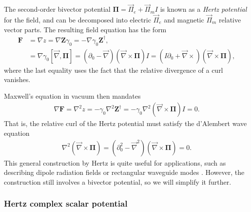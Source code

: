\documentclass[1p,sort&compress]{elsarticle}
\numberwithin{equation}{section}
\newcommand{\rv}[1]{\vec{#1}}
\newcommand{\bv}[1]{\mathbf{#1}}
\begin{document}
The second-order bivector potential $\bv{\Pi} = \rv{\Pi}_e + \rv{\Pi}_m I$ is known as a \emph{Hertz potential} for the field, and can be decomposed into electric $\rv{\Pi}_e$ and magnetic $\rv{\Pi}_m$ relative vector parts.  The resulting field equation has the form \cite{Bialynicki-Birula2013}
\begin{align}
  \bv{F} &= \nabla z = \nabla \bv{Z}\gamma_0 = - \nabla \gamma_0 \bv{Z}^\dagger, \\
  &= \nabla \gamma_0 [\rv{\nabla},\bv{\Pi}] = (\partial_0 - \rv{\nabla})(\rv{\nabla}\times\bv{\Pi}) I = (I\partial_0 + \rv{\nabla}\times)(\rv{\nabla}\times\bv{\Pi}), \nonumber
\end{align}
where the last equality uses the fact that the relative divergence of a curl vanishes.

Maxwell's equation in vacuum then mandates
\begin{align}
  \nabla \bv{F} = \nabla^2 z = -\gamma_0\nabla^2 \bv{Z}^\dagger = -\gamma_0\nabla^2(\rv{\nabla}\times\bv{\Pi})I = 0.
\end{align}
That is, the relative curl of the Hertz potential must satisfy the d'Alembert wave equation
\begin{align}
  \nabla^2(\rv{\nabla}\times\bv{\Pi}) = (\partial_0^2 - \rv{\nabla}^2)(\rv{\nabla}\times\bv{\Pi}) = 0.
\end{align}
This general construction by Hertz is quite useful for applications, such as describing dipole radiation fields or rectangular waveguide modes \cite{Essex1977}.  However, the construction still involves a bivector potential, so we will simplify it further.


\subsubsection{Hertz complex scalar potential}

\end{document}
